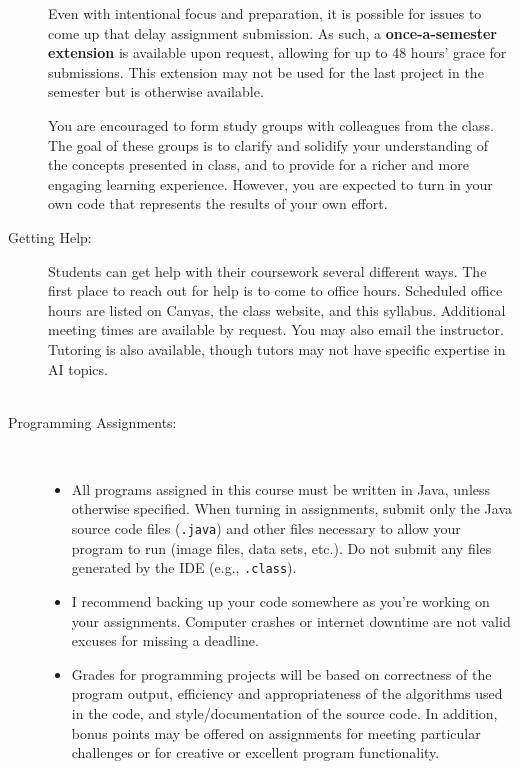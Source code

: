 \documentclass [letterpaper,11pt]{article}
\begin{document}
\begin{description}
Even with intentional focus and preparation, it is possible for issues to come up that delay assignment submission.  As such, a \textbf{once-a-semester extension} is available upon request, allowing for up to 48 hours' grace for submissions. This extension may not be used for the last project in the semester but is otherwise available.

You are encouraged to form study groups with colleagues from the class. The goal of these groups is to clarify and solidify your understanding of the concepts presented in class, and to provide for a richer and more engaging learning experience. However, you are expected to turn in your own code that represents the results of your own effort. 

\item[Getting Help:]
Students can get help with their coursework several different ways. The first place to
reach out for help is to come to office hours. Scheduled office hours are listed on Canvas, the class website, and this syllabus.
Additional meeting times are available by request. You may also email the instructor.  Tutoring is also available, though tutors may not have specific expertise in AI topics.
\\\\
\item[Programming Assignments:]\

\begin{itemize}\setlength{\itemsep}{0em}\setlength{\parskip}{0pt}
	\item All programs assigned in this course must be written in Java, unless otherwise specified.  When turning in assignments,
	submit only the Java source code files (\texttt{.java}) and other files necessary to allow your program to run (image files, data sets, etc.). Do not submit any files generated by the IDE (e.g., \texttt{.class}).	
			\item I recommend backing up your code somewhere as you're working on your assignments.  Computer
		crashes or internet downtime are not valid excuses for missing a deadline.
				
\item Grades for programming projects will be based on correctness of the program output, efficiency and appropriateness of the algorithms used in the code, and style/documentation of the source code.  In addition, bonus points may be offered on assignments for meeting particular challenges or for creative or excellent program functionality.


\end{itemize}
\end{description}
\end{document}
